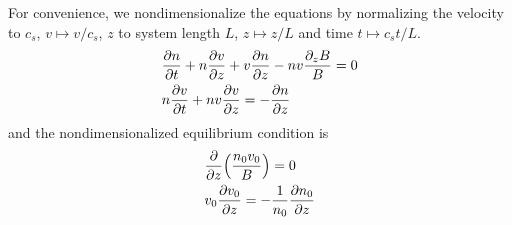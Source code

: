 For convenience, we nondimensionalize the equations by normalizing the velocity to $c_s$, $v\mapsto v/c_s$, $z$ to system length $L$, $z \mapsto z/L$ and time $t\mapsto c_s t/L$.
\begin{align}
    &\pdv{n}{t} + n\pdv{v}{z} + v\pdv{n}{z} - nv\frac{\partial_z B}{B} = 0 \\
    &n\pdv{v}{t} + nv\pdv{v}{z} = -\pdv{n}{z}
\end{align}
and the nondimensionalized equilibrium condition is
\begin{align}
    &\pdv{z}(\frac{n_0v_0}{B}) = 0 \label{eq:equilibrium-convervation-of-mass}\\
    &v_0\pdv{v_0}{z} = -\frac{1}{n_0}\pdv{n_0}{z} \label{eq:equilibrium-convervation-of-momentum}
\end{align}


